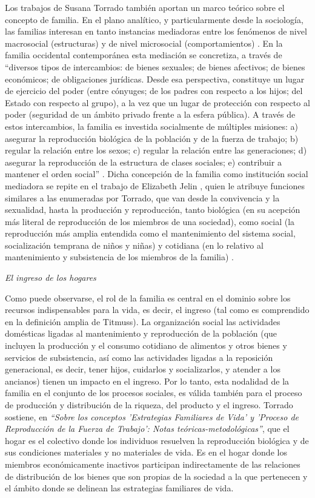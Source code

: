 Los trabajos de Susana Torrado también aportan un marco teórico sobre el concepto de familia. En el plano analítico, y particularmente desde la sociología, las familias interesan en tanto instancias mediadoras entre los fenómenos de nivel macrosocial (estructuras) y de nivel microsocial (comportamientos) \cite{torrado1998}. En la familia occidental contemporánea esta mediación se concretiza, a través de “diversos tipos de intercambios: de bienes sexuales; de bienes afectivos; de bienes económicos; de obligaciones jurídicas. Desde esa perspectiva, constituye un lugar de ejercicio del poder (entre cónyuges; de los padres con respecto a los hijos; del Estado con respecto al grupo), a la vez que un lugar de protección con respecto al poder (seguridad de un ámbito privado frente a la esfera pública). A través de estos intercambios, la familia es investida socialmente de múltiples misiones: a) asegurar la reproducción biológica de la población y de la fuerza de trabajo; b) regular la relación entre los sexos; c) regular la relación entre las generaciones; d) asegurar la reproducción de la estructura de clases sociales; e) contribuir a mantener el orden social” \cite[p.~15]{torrado2003}. Dicha concepción de la familia como institución social mediadora se repite en el trabajo de Elizabeth Jelin \citeyear{jelin}, quien le atribuye funciones similares a las enumeradas por Torrado, que van desde la convivencia y la sexualidad, hasta la producción y reproducción, tanto biológica (en su acepción más literal de reproducción de los miembros de una sociedad), como social (la reproducción más amplia entendida como el mantenimiento del sistema social, socialización temprana de niños y niñas) y cotidiana (en lo relativo al mantenimiento y subsistencia de los miembros de la familia) \cite[p.~46]{jelin}.
	
\textit{El ingreso de los hogares}
	
Como puede observarse, el rol de la familia es central en el dominio sobre los recursos indispensables para la vida, es decir, el ingreso (tal como es comprendido en la definición amplia de Titmuss). La organización social las actividades domésticas ligadas al mantenimiento y reproducción de la población (que incluyen la producción y el consumo cotidiano de alimentos y otros bienes y servicios de subsistencia, así como las actividades ligadas a la reposición generacional, es decir, tener hijos, cuidarlos y socializarlos, y atender a los ancianos) tienen un impacto en el ingreso. Por lo tanto, esta nodalidad de la familia en el conjunto de los procesos sociales, es válida también para el proceso de producción y distribución de la riqueza, del producto y el ingreso. Torrado \citeyear{torrado1981} sostiene, en \textit{“Sobre los conceptos 'Estrategias Familiares de Vida' y 'Proceso de Reproducción de la Fuerza de Trabajo': Notas teóricas-metodológicas”}, que el hogar es el colectivo donde los individuos resuelven la reproducción biológica y de sus condiciones materiales y no materiales de vida. Es en el hogar donde los miembros económicamente inactivos participan indirectamente de las relaciones de distribución de los bienes que son propias de la sociedad a la que pertenecen y el ámbito donde se delinean las estrategias familiares de vida. 
	
